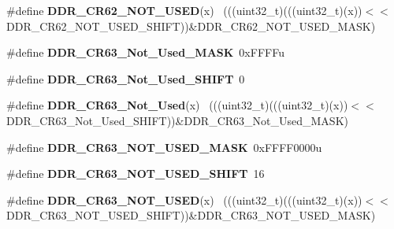 \begin{DoxyCompactItemize}
\item 
\hypertarget{group___d_d_r___register___masks_gaf89b05959ebcf430c3654922a50d9046}{}\#define {\bfseries D\+D\+R\+\_\+\+C\+R62\+\_\+\+N\+O\+T\+\_\+\+U\+S\+E\+D}(x)                                      ~(((uint32\+\_\+t)(((uint32\+\_\+t)(x))$<$$<$D\+D\+R\+\_\+\+C\+R62\+\_\+\+N\+O\+T\+\_\+\+U\+S\+E\+D\+\_\+\+S\+H\+I\+F\+T))\&D\+D\+R\+\_\+\+C\+R62\+\_\+\+N\+O\+T\+\_\+\+U\+S\+E\+D\+\_\+\+M\+A\+S\+K)\label{group___d_d_r___register___masks_gaf89b05959ebcf430c3654922a50d9046}

\item 
\hypertarget{group___d_d_r___register___masks_ga6bbaafd4f3f8c0da5d84f5aa64cd3faa}{}\#define {\bfseries D\+D\+R\+\_\+\+C\+R63\+\_\+\+Not\+\_\+\+Used\+\_\+\+M\+A\+S\+K}~0x\+F\+F\+F\+Fu\label{group___d_d_r___register___masks_ga6bbaafd4f3f8c0da5d84f5aa64cd3faa}

\item 
\hypertarget{group___d_d_r___register___masks_ga33a04735ab2e0f571b2761115780426e}{}\#define {\bfseries D\+D\+R\+\_\+\+C\+R63\+\_\+\+Not\+\_\+\+Used\+\_\+\+S\+H\+I\+F\+T}~0\label{group___d_d_r___register___masks_ga33a04735ab2e0f571b2761115780426e}

\item 
\hypertarget{group___d_d_r___register___masks_ga2cac5d81e9dbb670f57d30190d66038e}{}\#define {\bfseries D\+D\+R\+\_\+\+C\+R63\+\_\+\+Not\+\_\+\+Used}(x)                                      ~(((uint32\+\_\+t)(((uint32\+\_\+t)(x))$<$$<$D\+D\+R\+\_\+\+C\+R63\+\_\+\+Not\+\_\+\+Used\+\_\+\+S\+H\+I\+F\+T))\&D\+D\+R\+\_\+\+C\+R63\+\_\+\+Not\+\_\+\+Used\+\_\+\+M\+A\+S\+K)\label{group___d_d_r___register___masks_ga2cac5d81e9dbb670f57d30190d66038e}

\item 
\hypertarget{group___d_d_r___register___masks_ga1ce899bb35c80b8752fb187be8579ef5}{}\#define {\bfseries D\+D\+R\+\_\+\+C\+R63\+\_\+\+N\+O\+T\+\_\+\+U\+S\+E\+D\+\_\+\+M\+A\+S\+K}~0x\+F\+F\+F\+F0000u\label{group___d_d_r___register___masks_ga1ce899bb35c80b8752fb187be8579ef5}

\item 
\hypertarget{group___d_d_r___register___masks_ga3c70314762c6678df7f3bd85038c81f5}{}\#define {\bfseries D\+D\+R\+\_\+\+C\+R63\+\_\+\+N\+O\+T\+\_\+\+U\+S\+E\+D\+\_\+\+S\+H\+I\+F\+T}~16\label{group___d_d_r___register___masks_ga3c70314762c6678df7f3bd85038c81f5}

\item 
\hypertarget{group___d_d_r___register___masks_ga98bc863640c37538f1adf73049791020}{}\#define {\bfseries D\+D\+R\+\_\+\+C\+R63\+\_\+\+N\+O\+T\+\_\+\+U\+S\+E\+D}(x)                                      ~(((uint32\+\_\+t)(((uint32\+\_\+t)(x))$<$$<$D\+D\+R\+\_\+\+C\+R63\+\_\+\+N\+O\+T\+\_\+\+U\+S\+E\+D\+\_\+\+S\+H\+I\+F\+T))\&D\+D\+R\+\_\+\+C\+R63\+\_\+\+N\+O\+T\+\_\+\+U\+S\+E\+D\+\_\+\+M\+A\+S\+K)\label{group___d_d_r___register___masks_ga98bc863640c37538f1adf73049791020}


\end{DoxyCompactItemize}
